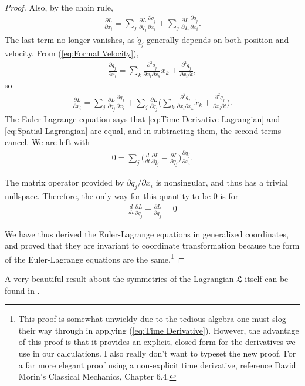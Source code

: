 \documentclass[10pt, psamsfonts]{amsart}
\theoremstyle{definition}
\theoremstyle{remark}
\numberwithin{equation}{section}
\begin{document}
\begin{proof}
Also, by the chain rule, 
\begin{align*}
  \frac{\partial L}{\partial x_i}  = \sum_j \frac{\partial L}{\partial q_j} \frac{\partial q_j}{\partial x_i} + \sum_j \frac{\partial L}{\partial \dot{q}_j} \frac{\partial \dot{q}_j}{\partial x_i}.
\end{align*}
The last term no longer vanishes, as $\dot{q}_j$ generally depends on both position and velocity. From (\ref{eq:Formal Velocity}), 
\begin{gather*}
  \frac{\partial \dot{q}_j}{\partial x_i} = \sum_k \frac{\partial^2 q_j}{\partial x_i \partial x_k} \dot{x}_k + \frac{\partial^2 q_j}{\partial x_i \partial t},
\end{gather*}
so
\begin{gather}
\label{eq:Spatial Lagrangian}
  \frac{\partial L}{\partial x_i} = \sum_j \frac{\partial L}{\partial q_j} \frac{\partial q_j}{\partial x_i} + \sum_j \frac{\partial L}{\partial \dot{q}_j}\bigg(\sum_k \frac{\partial^2 q_j}{\partial x_i \partial x_k} \dot{x}_k + \frac{\partial^2 q_j}{\partial x_i \partial t}  \bigg).
\end{gather}
The Euler-Lagrange equation says that \ref{eq:Time Derivative Lagrangian} and \ref{eq:Spatial Lagrangian} are equal, and in subtracting them, the second terms cancel. We are left with
\begin{align*}
  0 = \sum_j \bigg(\frac{d}{dt} \frac{\partial L}{\partial \dot{q}_j} - \frac{\partial L}{\partial q_j} \bigg) \frac{\partial q_j}{\partial x_i} .
\end{align*}

The matrix operator provided by $\partial q_j/\partial x_i $ is nonsingular, and thus has a trivial nullspace. Therefore, the only way for this quantity to be 0 is for
\begin{align*}
  \frac{d}{dt} \frac{\partial L}{\partial \dot{q}_j} - \frac{\partial L}{\partial q_j} = 0
\end{align*}

We have thus derived the Euler-Lagrange equations in generalized coordinates, and proved that they are invariant to coordinate transformation because the form of the Euler-Lagrange equations are the same.\footnote{This proof is somewhat unwieldy due to the tedious algebra one must slog their way through in applying (\ref{eq:Time Derivative}). However, the advantage of this proof is that it provides an explicit, closed form for the derivatives we use in our calculations.  I also really don't want to typeset the new proof. For a far more elegant proof using a non-explicit time derivative, reference \cite{6} David Morin's Classical Mechanics, Chapter 6.4.}
\end{proof}
A very beautiful result about the symmetries of the Lagrangian $\mathfrak{L}$ itself can be found in \cite{6}.\\
\end{document}
